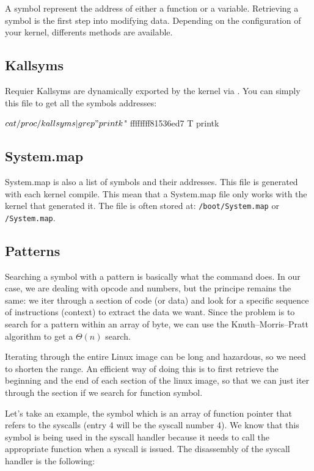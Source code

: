 A symbol represent the address of either a function or a variable. Retrieving
a symbol is the first step into modifying data.
Depending on the configuration of your kernel, differents methods are available.

\subsection{Kallsyms}
Requier
Kallsyms are dynamically exported by the kernel via .
You can simply  this file to get all the symbols addresses:\\
\begin{bashcode}
$ cat /proc/kallsyms| grep " printk$"
ffffffff81536ed7 T printk
\end{bashcode}

\subsection{System.map}
System.map is also a list of symbols and their addresses. This file is
generated with each kernel compile. This mean that a System.map file only works with the
kernel that generated it.
The file is often stored at: \texttt{/boot/System.map} or \texttt{/System.map}.

\subsection{Patterns}
Searching a symbol with a pattern is basically what the  command
does. In our case, we are dealing with opcode and numbers, but the principe
remains the same: we iter through a section of code (or data) and look for
a specific sequence of instructions (context) to extract the data we want.
Since the problem is to search for a pattern within an array of byte, we can
use the Knuth–Morris–Pratt algorithm to get a $\Theta(n)$ search.

Iterating through the entire Linux image can be long and hazardous, so we need
to shorten the range. An efficient way of doing this is to first retrieve the
beginning and the end of each section of the linux image, so that we can just
iter through the  section if we search for function symbol.


Let's take an example, the  symbol which is an array of
function pointer that refers to the syscalls (entry 4 will be the syscall
number 4).
We know that this symbol is being used in the syscall handler because it needs
to call the appropriate function when a syscall is issued.
The disassembly of the syscall handler is the following:\\
\begin{bashcode}
$ gdb -batch -ex 'file ./vmlinux' -ex 'disassemble system_call_fastpath'}
Dump of assembler code for function system_call_fastpath:
   0xffffffff81872040 <+0>: cmp    $0x142,%
   0xffffffff81872046 <+6>: ja     0xffffffff81872057 <ret_from_sys_call>
   0xffffffff81872048 <+8>: mov    %
   0xffffffff8187204b <+11>:    callq  *-0x7e5ffd40(,%
   0xffffffff81872052 <+18>:    mov    %
End of assembler dump.
\end{bashcode}

